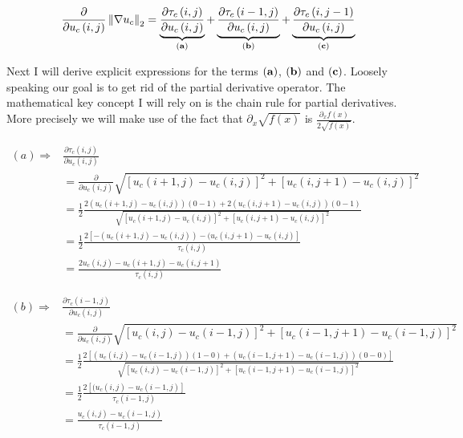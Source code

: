 \documentclass{paper}
\newcommand{\norm}[1]{\left\lVert#1\right\rVert}
\begin{document}
\begin{equation}
	\frac{\partial}{\partial u_{c}\left(i,j\right)} \norm{\nabla{u_c}}_2 = \underbrace{\frac{\partial{\tau_{c}\left(i,j\right)}}{\partial u_{c}\left(i,j\right)}}_{\bf{(a)}} + \underbrace{\frac{\partial{\tau_{c}\left(i-1,j\right)}}{\partial u_{c}\left(i,j\right)}}_{\bf{(b)}} + \underbrace{\frac{\partial{\tau_{c}\left(i,j-1\right)}}{\partial u_{c}\left(i,j\right)}}_{\bf{(c)}}
\end{equation}

Next I will derive explicit expressions for the terms $\bf{(a)}$, $\bf{(b)}$ and $\bf{(c)}$. Loosely speaking our goal is to get rid of the partial derivative operator. The mathematical key concept I will rely on is the chain rule for partial derivatives. More precisely we will make use of the fact that $\partial_{x}\sqrt{f(x)}$ is $\frac{\partial_{x} f(x)}{2 \sqrt{f(x)}}$.

\begin{align}
	(a) \Longrightarrow
	& \frac{\partial{\tau_{c}\left(i,j\right)}}{\partial u_{c}\left(i,j\right)} \nonumber \\
	&= \frac{\partial}{\partial{u_{c}\left(i,j\right)}} \sqrt{ \left[u_{c}(i+1,j) - u_{c}(i,j)\right]^2 + \left[u_{c}(i,j+1) - u_{c}(i,j)\right]^2} \nonumber \\
	&= \frac{1}{2} \frac{2 (u_{c}(i+1,j)-u_{c}(i,j))(0-1) + 2 (u_{c}(i,j+1)-u_{c}(i,j))(0-1)}{\sqrt{ \left[u_{c}(i+1,j) - u_{c}(i,j)\right]^2 + \left[u_{c}(i,j+1) - u_{c}(i,j)\right]^2}} \nonumber \\
	&= \frac{1}{2} \frac{2 [-(u_{c}(i+1,j)-u_{c}(i,j)) - (u_{c}(i,j+1)-u_{c}(i,j)]}{\tau_{c}\left(i,j\right)} \nonumber \\
	&= \frac{2 u_{c} \left(i,j\right) - u_{c} \left(i+1,j\right)-u_{c} \left(i,j+1\right)}{\tau_{c}\left(i,j\right)}
\end{align}

\begin{align}
(b) \Longrightarrow
	& \frac{\partial{\tau_{c}\left(i-1,j\right)}}{\partial u_{c}\left(i,j\right)} \nonumber \\
	&= \frac{\partial}{\partial{u_{c}\left(i,j\right)}} \sqrt{ \left[u_{c}(i,j) - u_{c}(i-1,j)\right]^2 + \left[u_{c}(i-1,j+1) - u_{c}(i-1,j)\right]^2} \nonumber \\
	&= \frac{1}{2} \frac{2[\left(u_{c}(i,j) - u_{c}(i-1,j)\right)(1-0) + \left(u_{c}(i-1,j+1) - u_{c}(i-1,j)\right)(0-0)]}{\sqrt{ \left[u_{c}(i,j) - u_{c}(i-1,j)\right]^2 + \left[u_{c}(i-1,j+1) - u_{c}(i-1,j)\right]^2}} \nonumber \\
	&= \frac{1}{2} \frac{2\left[(u_{c}(i,j) - u_{c}(i-1,j)\right]}{\tau_{c}\left(i-1,j\right)} \nonumber \\
	&= \frac{u_{c}\left(i,j\right) - u_{c}\left(i-1,j\right)}{\tau_{c}\left(i-1,j\right)}
\end{align}
\end{document}
